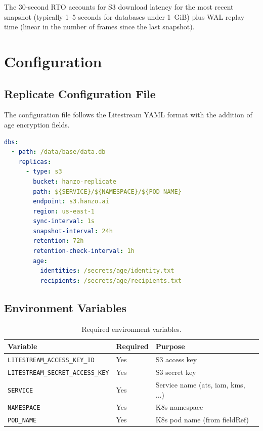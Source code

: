 \documentclass[11pt]{article}
\begin{document}
The 30-second RTO accounts for S3 download latency for the most recent
snapshot (typically 1--5 seconds for databases under 1~GiB) plus WAL replay
time (linear in the number of frames since the last snapshot).

\section{Configuration}

\subsection{Replicate Configuration File}

The configuration file follows the Litestream YAML format with the addition
of age encryption fields.

\begin{lstlisting}[language=YAML,caption={replicate.yml --- canonical configuration.}]
dbs:
  - path: /data/base/data.db
    replicas:
      - type: s3
        bucket: hanzo-replicate
        path: ${SERVICE}/${NAMESPACE}/${POD_NAME}
        endpoint: s3.hanzo.ai
        region: us-east-1
        sync-interval: 1s
        snapshot-interval: 24h
        retention: 72h
        retention-check-interval: 1h
        age:
          identities: /secrets/age/identity.txt
          recipients: /secrets/age/recipients.txt
\end{lstlisting}

\subsection{Environment Variables}

\begin{table}[H]
\centering
\begin{tabular}{@{}lll@{}}
\toprule
\textbf{Variable} & \textbf{Required} & \textbf{Purpose} \\
\midrule
\texttt{LITESTREAM\_ACCESS\_KEY\_ID}     & Yes & S3 access key \\
\texttt{LITESTREAM\_SECRET\_ACCESS\_KEY} & Yes & S3 secret key \\
\texttt{SERVICE}                          & Yes & Service name (ats, iam, kms, ...) \\
\texttt{NAMESPACE}                        & Yes & K8s namespace \\
\texttt{POD\_NAME}                        & Yes & K8s pod name (from fieldRef) \\
\bottomrule
\end{tabular}
\caption{Required environment variables.}
\label{tab:env}
\end{table}
\end{document}
